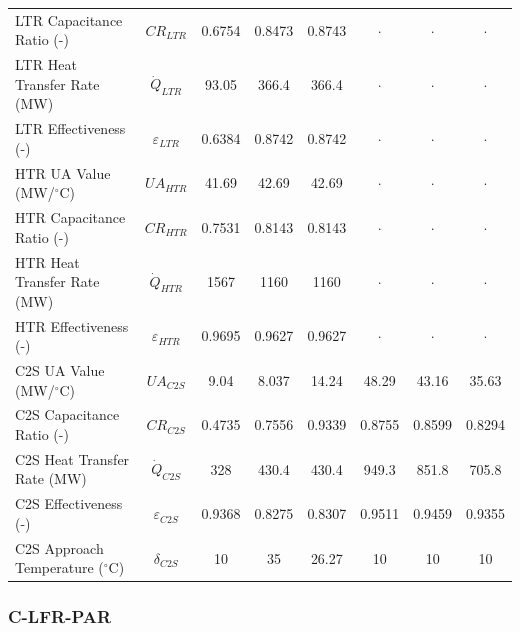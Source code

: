 \begin{paracol}{2}
\begin{specialtable}[H]
{\begin{tabular}{lc|c|cc|ccc}
    LTR Capacitance Ratio (-)	&	$CR_{LTR}$	&	0.6754	&	0.8473	&	0.8743	&	$\cdot$	&	$\cdot$	&	$\cdot$	\\
    LTR Heat Transfer Rate (MW)	&	$\dot{Q}_{LTR}$	&	93.05	&	366.4	&	366.4	&	$\cdot$	&	$\cdot$	&	$\cdot$	\\
    LTR Effectiveness (-)	&	$\varepsilon_{LTR}$	&	0.6384	&	0.8742	&	0.8742	&	$\cdot$	&	$\cdot$	&	$\cdot$	\\
    HTR UA Value (MW/$^{\circ}$C)	&	$UA_{HTR}$	&	41.69	&	42.69	&	42.69	&	$\cdot$	&	$\cdot$	&	$\cdot$	\\
    HTR Capacitance Ratio (-)	&	$CR_{HTR}$	&	0.7531	&	0.8143	&	0.8143	&	$\cdot$	&	$\cdot$	&	$\cdot$	\\
    HTR Heat Transfer Rate (MW)	&	$\dot{Q}_{HTR}$	&	1567	&	1160	&	1160	&	$\cdot$	&	$\cdot$	&	$\cdot$	\\
    HTR Effectiveness (-)	&	$\varepsilon_{HTR}$	&	0.9695	&	0.9627	&	0.9627	&	$\cdot$	&	$\cdot$	&	$\cdot$	\\
    C2S UA Value (MW/$^{\circ}$C)	&	$UA_{C2S}$	&	9.04	&	8.037	&	14.24	&	48.29	&	43.16	&	35.63	\\
    C2S Capacitance Ratio (-)	&	$CR_{C2S}$	&	0.4735	&	0.7556	&	0.9339	&	0.8755	&	0.8599	&	0.8294	\\
    C2S Heat Transfer Rate (MW)	&	$\dot{Q}_{C2S}$	&	328	&	430.4	&	430.4	&	949.3	&	851.8	&	705.8	\\
    C2S Effectiveness (-)	&	$\varepsilon_{C2S}$	&	0.9368	&	0.8275	&	0.8307	&	0.9511	&	0.9459	&	0.9355	\\
    C2S Approach Temperature ($^{\circ}$C)	&	$\delta_{C2S}$	&	10	&	35	&	26.27	&	10	&	10	&	10	\\
    \bottomrule
    \end{tabular}
    }
\end{specialtable}


\subsubsection{C-LFR-PAR}


\end{paracol}
